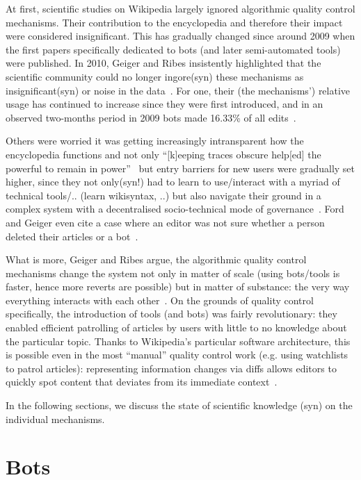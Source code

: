 At first, scientific studies on Wikipedia largely ignored algorithmic quality control mechanisms.
Their contribution to the encyclopedia and therefore their impact were considered insignificant. %
This has gradually changed since around 2009 when the first papers specifically dedicated to bots (and later semi-automated tools) were published.
In 2010, Geiger and Ribes insistently highlighted that the scientific community could no longer ingore(syn) these mechanisms as insignificant(syn) or noise in the data~\cite{GeiRib2010}.
For one, their (the mechanisms') relative usage has continued to increase since they were first introduced, and in an observed two-months period in 2009 bots made 16.33\% of all edits~\cite{Geiger2009}.

Others were worried it was getting increasingly intransparent how the encyclopedia functions and not only ``[k]eeping traces obscure help[ed] the powerful to remain in power''~\cite{ForGei2012} but entry barriers for new users were gradually set higher, since they not only(syn!) had to learn to use/interact with a myriad of technical tools/.. (learn wikisyntax, ..) but also navigate their ground in a complex system with a decentralised socio-technical mode of governance~\cite{Geiger2017}.
Ford and Geiger even cite a case where an editor was not sure whether a person deleted their articles or a bot~\cite{ForGei2012}.

What is more, Geiger and Ribes argue, the algorithmic quality control mechanisms change the system not only in matter of scale (using bots/tools is faster, hence more reverts are possible) but in matter of substance: the very way everything interacts with each other~\cite{GeiRib2010}.
On the grounds of quality control specifically, the introduction of tools (and bots) was fairly revolutionary:
they enabled efficient patrolling of articles by users with little to no knowledge about the particular topic.
Thanks to Wikipedia's particular software architecture, this is possible even in the most ``manual'' quality control work (e.g. using watchlists to patrol articles): representing information changes via diffs allows editors to quickly spot content that deviates from its immediate context~\cite{GeiRib2010}.

In the following sections, we discuss the state of scientific knowledge (syn) on the individual mechanisms.


\section{Bots}
\label{section:bots}

